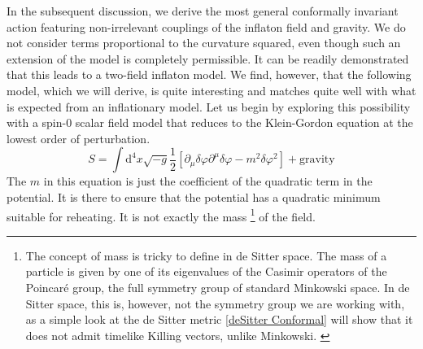 \documentclass[aps,prd,reprint,preprintnumbers,showpacs,floatfix,nofootinbib,superscript address]{revtex4-2}
\begin{document}
In the subsequent discussion, we derive the most general conformally invariant action featuring non-irrelevant couplings of the inflaton field and gravity. We do not consider terms proportional to the curvature squared, even though such an extension of the model is completely permissible. It can be readily demonstrated that this leads to a two-field inflaton model. We find, however, that the following model, which we will derive, is quite interesting and matches quite well with what is expected from an inflationary model. Let us begin by exploring this possibility with a spin-0 scalar field model that reduces to the Klein-Gordon equation at the lowest order of perturbation.
\begin{equation} \label{25}
    S = \int \mathrm{d}^4 x \sqrt{-g} \frac{1}{2} \left[ \partial_\mu \delta \varphi \partial^\mu \delta \varphi - m^2   \delta\varphi^2   \right] + \text{gravity}
\end{equation}
The $m$ in this equation is just the coefficient of the quadratic term in the potential. It is there to ensure that the potential has a quadratic minimum suitable for reheating. It is not exactly the mass \footnote{The concept of mass is tricky to define in de Sitter space. The mass of a particle is given by one of its eigenvalues of the Casimir operators of the Poincaré group, the full symmetry group of standard Minkowski space. In de Sitter space, this is, however, not the symmetry group we are working with, as a simple look at the de Sitter metric \cref{deSitter Conformal} will show that it does not admit timelike Killing vectors, unlike Minkowski. \label{Footnote 1}} of the field.
\end{document}
